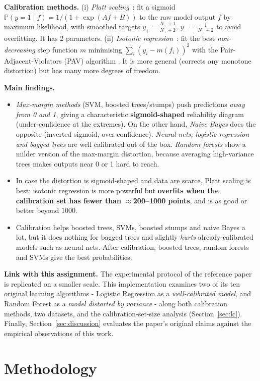 \documentclass[11pt,a4paper]{article}
\newcommand{\Prob}{\mathbb{P}}
\begin{document}
\textbf{Calibration methods.}
(i) \emph{Platt scaling}~\cite{platt99}: fit a sigmoid $\Prob(y{=}1\mid f)=1/(1+\exp(Af+B))$ to the raw model output $f$ by maximum likelihood, with smoothed targets $y_+=\frac{N_++1}{N_++2}$, $y_-=\frac{1}{N_-+2}$ to avoid overfitting. It has 2 parameters.
(ii) \emph{Isotonic regression}~\cite{ze02}: fit the best \emph{non-decreasing} step function $m$ minimising $\sum_i (y_i-m(f_i))^2$ with the Pair-Adjacent-Violators (PAV) algorithm \cite{ayer55}. It is more general (corrects any monotone distortion) but has many more degrees of freedom.

\textbf{Main findings.}
\begin{itemize}\setlength\itemsep{0pt}
\item \emph{Max-margin methods} (SVM, boosted trees/stumps) push predictions \emph{away from 0 and 1}, giving a characteristic \textbf{sigmoid-shaped} reliability diagram (under-confidence at the extremes). On the other hand, \emph{Naive Bayes} does the opposite (inverted sigmoid, over-confidence). \emph{Neural nets, logistic regression and bagged trees} are well calibrated out of the box. \emph{Random forests} show a milder version of the max-margin distortion, because averaging high-variance trees makes outputs near 0 or 1 hard to reach.
\item In case the distortion is sigmoid-shaped and data are scarce, Platt scaling is best; isotonic regression is more powerful but \textbf{overfits when the calibration set has fewer than $\approx$200--1000 points}, and is as good or better beyond 1000.
\item Calibration helps boosted trees, SVMs, boosted stumps and naive Bayes a lot, but it does nothing for bagged trees and slightly \emph{hurts} already-calibrated models such as neural nets. After calibration, boosted trees, random forests and SVMs give the best probabilities.
\end{itemize}
\textbf{Link with this assignment.} The experimental protocol of the reference paper is replicated on a smaller scale. This implementation examines two of its ten original learning algorithms - Logistic Regression as a \textit{well-calibrated model}, and Random Forest as a \textit{model distorted by variance} - along both calibration methods, two datasets, and the calibration-set-size analysis (Section~\ref{sec:lc}). Finally, Section~\ref{sec:discussion} evaluates the paper's original claims against the empirical observations of this work.

\section{Methodology}
\end{document}
